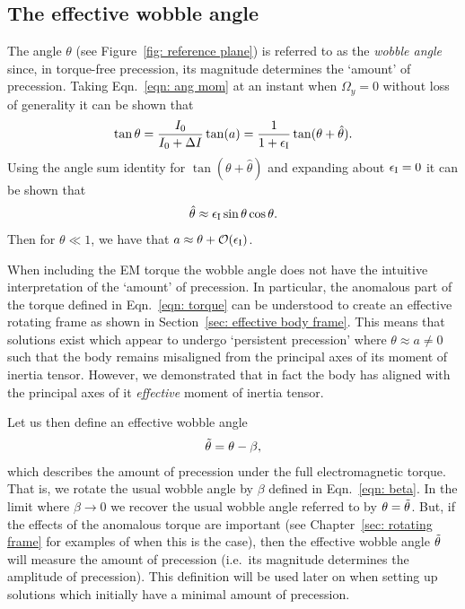 \documentclass[../full_thesis/full_thesis.tex]{subfiles}
\begin{document}
\subsection{The effective wobble angle}
\label{sec: wobble angle}
The angle $\theta$ (see Figure~\ref{fig: reference plane}) is referred to as the
\emph{wobble angle} since, in torque-free precession, its magnitude determines
the `amount' of precession. Taking Eqn.~\eqref{eqn: ang mom} at an instant when
$\Omega_y=0$ without loss of generality it can be shown that
\begin{align}
\tan\theta  = \frac{I_0}{I_0 + \Delta I} \tan(a) = \frac{1}{1+\epsilon_{\mathrm{I}}}\tan(\theta + \hat\theta).
\end{align}
Using the angle sum identity for $\tan(\theta + \hat{\theta})$ and expanding
about $\epsilon_{\mathrm{I}}=0$ it can be shown \citep{Jones2001} that
\begin{align}
\hat{\theta} \approx \epsilon_{\mathrm{I}}\sin\theta\cos\theta.
\label{eqn: theta hat theta}
\end{align}
Then for $\theta \ll 1$, we have that $a\approx \theta + \mathcal{O}(\epsilon_{\mathrm{I}})$.

When including the EM torque the wobble angle
does not have the intuitive interpretation of the `amount' of precession.  In
particular, the anomalous part of the torque defined in Eqn.~\eqref{eqn: torque}
can be understood to create an effective rotating frame as shown in Section~\ref{sec:
effective body frame}. This means that solutions exist which appear to undergo
`persistent precession' where $\theta \approx a\ne0$ such that the body remains
misaligned from the principal axes of its moment of inertia tensor. However, we
demonstrated that in fact the body has aligned with the principal axes of
it \emph{effective} moment of inertia tensor.

Let us then define an effective wobble angle
\begin{align}
\tilde{\theta} = \theta - \beta,
\label{eqn: effective wobble angle}
\end{align}
which describes the amount of precession under the full electromagnetic torque.
That is, we rotate the usual wobble angle by $\beta$ defined in
Eqn.~\eqref{eqn: beta}. In the limit where $\beta \rightarrow 0$ we recover the
usual wobble angle referred to by \citet{Jones2001} $\theta = \tilde{\theta}$.
But, if the effects of the anomalous torque are important (see Chapter~\ref{sec:
rotating frame} for examples of when this is the case), then the effective wobble
angle $\tilde{\theta}$ will measure the amount of precession (i.e.\ its magnitude
determines the amplitude of precession). This definition will be used later on
when setting up solutions which initially have a minimal amount of precession.
\end{document}
